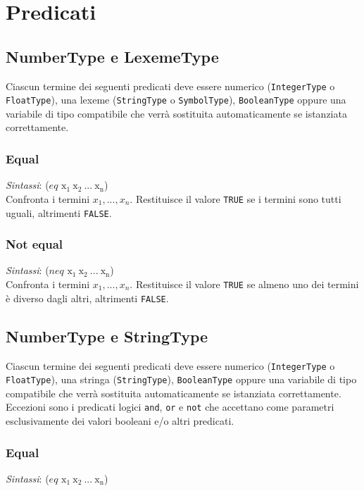 \section{Predicati}

\subsection{NumberType e LexemeType}

Ciascun termine dei seguenti predicati deve essere numerico (\verb!IntegerType! o \verb!FloatType!), una lexeme (\verb!StringType! o \verb!SymbolType!), \verb!BooleanType! oppure una variabile di tipo compatibile che verrà sostituita automaticamente se istanziata correttamente.

\subsubsection{Equal}
\emph{Sintassi}: ($eq$  $\mathrm{x_1 \ x_2 \ ... \ x_n}$)\\

Confronta i termini $x_1, ..., x_n$. Restituisce il valore \verb!TRUE! se i termini sono tutti uguali, altrimenti \verb!FALSE!.


\subsubsection{Not equal}
\emph{Sintassi}: ($neq$  $\mathrm{x_1 \ x_2 \ ... \ x_n}$)\\

Confronta i termini $x_1, ..., x_n$. Restituisce il valore \verb!TRUE! se almeno uno dei termini è diverso dagli altri, altrimenti \verb!FALSE!.

\subsection{NumberType e StringType}

Ciascun termine dei seguenti predicati deve essere numerico (\verb!IntegerType! o \verb!FloatType!), una stringa (\verb!StringType!), \verb!BooleanType! oppure una variabile di tipo compatibile che verrà sostituita automaticamente se istanziata correttamente. Eccezioni sono i predicati logici \verb!and!, \verb!or! e \verb!not! che accettano come parametri esclusivamente dei valori booleani e/o altri predicati.

\subsubsection{Equal}
\emph{Sintassi}: ($eq$  $\mathrm{x_1 \ x_2 \ ... \ x_n}$)\\

